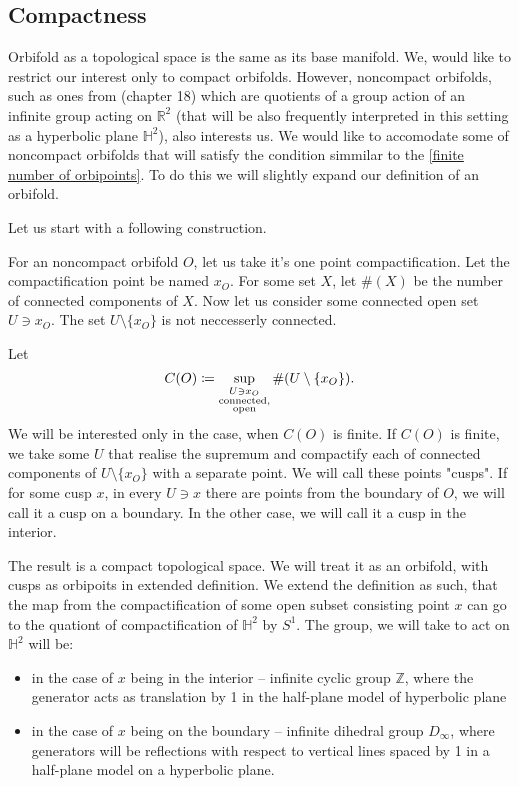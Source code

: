 \subsection{Compactness}\label{compactness}
Orbifold as a topological space is the same as its base manifold.
We, would like to restrict our interest only to compact orbifolds. 
However, noncompact orbifolds, such as ones from \cite{Conway2016} (chapter 18) 
which are quotients 
of a group action of an infinite group acting on $\mathbb{R}^2$ (that will 
be also frequently interpreted in this setting as a hyperbolic plane $\mathbb{H}^2$), 
also interests us. We would like to accomodate some of noncompact orbifolds that 
will satisfy the condition simmilar to the \ref{finite number of orbipoints}. 
To do this we will slightly expand our definition of an orbifold. 

Let us start with a following construction.

For an noncompact orbifold $O$, let us take it's one point compactification. 
Let the compactification point be named $x_O$.  
For some set $X$, let $\#(X)$ be the number of connected components of $X$.
Now let us consider some connected open set $U \ni x_O$. The set $U\setminus\{x_O\}$ is 
not neccesserly connected.
 
Let 
\begin{equation}
C(O) \coloneqq \sup\limits_{\substack{U \ni x_O \\ \rm connected, \\ \rm open }} 
\#(U\setminus\{x_O\}).
\end{equation}
We will be interested only in the case, when $C(O)$ is finite.
If $C(O)$ is finite, we take some $U$ that realise the supremum and compactify each of 
connected components of $U\setminus\{x_O\}$ with a separate point. We will call these points 
"cusps". If for some cusp $x$, in every $U \ni x$ there are points from the boundary of $O$, 
we will call it a cusp on a boundary. In the other case, we will call it a cusp in the interior.

The result is a compact topological space. We will treat it as an orbifold, with 
cusps as orbipoits in extended definition. 
We extend the definition as such, that the map from the compactification of 
some open subset consisting point $x$ can go to the quationt of compactification of 
$\mathbb{H}^2$ by $S^1$. The group, we will take to act on $\mathbb{H}^2$ will 
be:
\begin{itemize} 
\item in the case of $x$ being in the interior -- infinite cyclic group $\mathbb{Z}$, 
where the generator acts as translation by 1 
in the half-plane model of hyperbolic plane   
\item in the case of $x$ being on the boundary -- infinite dihedral group $D_\infty$, where 
generators will be reflections with respect to vertical lines spaced by 1 in a half-plane 
model on a hyperbolic plane.
\end{itemize}

